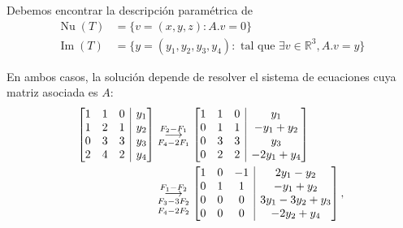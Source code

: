 \documentclass[handout]{beamer} %
\newcommand{\img}{\operatorname{Im}}
\newcommand{\nuc}{\operatorname{Nu}}
\newcommand{\R}{\mathbb R}
\begin{document}
        \begin{frame}
            Debemos encontrar la descripción paramétrica de
            \begin{align*}
                \nuc(T) &= \{v=(x,y,z):   A.{v}=0\}\\
                \img(T) &= \{y= (y_1,y_2,y_3,y_4): \text{ tal que } \exists v \in \R^3, A.{v} = {y}  \}
                \end{align*}
           
          
            En  ambos casos, la solución depende de resolver el sistema de ecuaciones cuya matriz asociada es $A$:
            \begin{align*}
            \left[\begin{array}{@{}*{3}{c}|c@{}}1&1&0&y_1\\1&2&1&y_2\\0&3&3&y_3\\2&4&2&y_4 \end{array}\right]
            &\underset{F_4-2F_1}{\stackrel{F_2 -F_1}{\longrightarrow}} 
            \left[\begin{array}{@{}*{3}{c}|c@{}}1&1&0&y_1\\0&1&1&-y_1+y_2\\0&3&3&y_3\\0&2&2&-2y_1 +y_4 \end{array}\right]\\
            &\underset{F_4-2F_2}{\underset{F_3-3F_2}{\stackrel{F_1 -F_2}{\longrightarrow}} } 
            \left[\begin{array}{@{}*{3}{c}|c@{}}1&0&-1&2y_1-y_2\\0&1&1&-y_1+y_2\\0&0&0&3y_1-3y_2+y_3\\0&0&0&-2y_2 +y_4 \end{array}\right],
            \end{align*}
        \end{frame}


        
\end{document}
